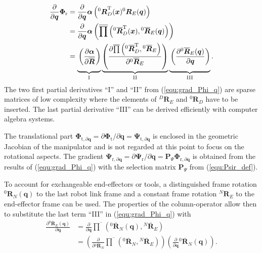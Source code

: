 \documentclass{svproc}
\newcommand{\bm}[1]{\boldsymbol{#1}}
\newcommand{\rotmat}[2]{{{ }^{#1}\boldsymbol{R}}_{#2}}
\newcommand{\rotmato}[2]{{{ }^{#1}\boldsymbol{\overline{R}}}_{#2}}
\newcommand{\transp}[0]{{\mathrm{T}}}
\begin{document}
%
\begin{align}
\frac{\partial}{\partial \bm{q}}\bm{\Phi}_{\mathrm{r}}
&=
\frac{\partial}{\partial \bm{q}} \bm{\alpha}\left(\rotmat{0}{D}^\transp(\bm{x}) \rotmat{0}{E}(\bm{q})\right) \label{equ:grad_Phi_q}\\
&=
\frac{\partial}{\partial \bm{q}} \bm{\alpha}\left(\overline{\prod}\left( \rotmato{0}{D}^\transp(\bm{x}), \rotmato{0}{E}(\bm{q})\right)\right) \nonumber \\
&=
\underbrace{\vphantom{\left(\frac{\partial \overline{\prod}\left(\rotmato{0}{D}^\transp, \rotmato{0}{E}\right)}{\partial \rotmato{0}{E}}\right)}\left(\frac{\partial \bm{\alpha}}{\partial \overline{\bm{R}}}\right)}_{\mathrm{I}}
\underbrace{\left(\frac{\partial \overline{\prod}\left(\rotmato{0}{D}^\transp, \rotmato{0}{E}\right)}{\partial \rotmato{0}{E}}\right)}_{\mathrm{II}}
\underbrace{\vphantom{\left(\frac{\partial \overline{\prod}\left(\rotmato{0}{D}^\transp, \rotmato{0}{E}\right)}{\partial \rotmato{0}{E}}\right)}\left(\frac{\partial \rotmato{0}{E}(\bm{q})}{\partial \bm{q}} \right)}_{\mathrm{III}}.  \nonumber
\end{align}
%
The two first partial derivatives ``I'' and ``II'' from (\ref{equ:grad_Phi_q}) are sparse matrices of low complexity where the elements of $\rotmat{D}{E}$ and $\rotmat{0}{D}$ have to be inserted.
The last partial derivative ``III'' can be derived efficiently with computer algebra systems.

The translational part $\bm{\Phi}_{\mathrm{t},\partial\bm{q}}=\partial \bm{\Phi}_{\mathrm{t}} / \partial \bm{q}=\bm{\Psi}_{\mathrm{t},\partial\bm{q}}$ is enclosed in the geometric Jacobian of the manipulator and is not regarded at this point to focus on the rotational aspects.
The gradient 
$\bm{\Psi}_{\mathrm{r}, \partial\bm{q}}=\partial \bm{\Psi}_{\mathrm{r}} / \partial \bm{q}=\bm{P}_{\Psi}\bm{\Phi}_{\mathrm{r},\partial\bm{q}}$
is obtained from the results of (\ref{equ:grad_Phi_q}) with the selection matrix $\bm{P}_{\Psi}$ from (\ref{equ:Psir_def}).

To account for exchangeable end-effectors or tools, a distinguished frame rotation $\rotmat{0}{N}(\bm{q})$ to the last robot link frame and a constant frame rotation $\rotmat{N}{E}$ to the end-effector frame can be used.
The properties of the column-operator allow then to substitute the last term ``III'' in (\ref{equ:grad_Phi_q}) with
%
\begin{align}
\frac{\partial \rotmato{0}{E}(\bm{q})}{\partial \bm{q}} 
&=
\frac{\partial}{\partial \bm{q}} \overline{\prod}\left( \rotmato{0}{N}(\bm{q}), \rotmato{N}{E}\right) \label{equ:ee_rotation_gradq}\\
&=
\left(\frac{\partial}{\partial \rotmato{0}{N}} \overline{\prod}\left( \rotmato{0}{N}, \rotmato{N}{E}\right)\right)
\left(\frac{\partial}{\partial \bm{q}} \rotmato{0}{N}(\bm{q})\right). \nonumber
\end{align}
%
\end{document}
